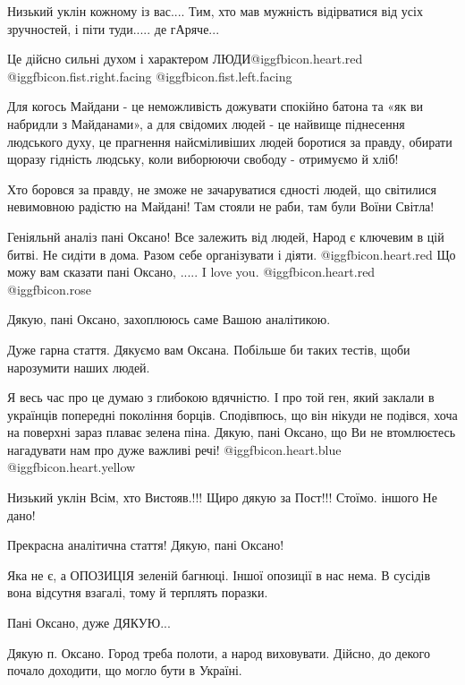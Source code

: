 \begin{itemize}
Низький уклін кожному із вас.... Тим, хто мав мужність відірватися від усіх
зручностей, і піти туди..... де гАряче...

Це дійсно сильні духом і характером ЛЮДИ@igg{fbicon.heart.red} @igg{fbicon.fist.right.facing}  @igg{fbicon.fist.left.facing} 



Для когось Майдани - це неможливість дожувати спокійно батона та «як ви
набридли з Майданами», а для свідомих людей - це найвище піднесення людського
духу, це прагнення найсміливіших людей боротися за правду, обирати щоразу
гідність людську, коли виборюючи свободу - отримуємо й хліб!

Хто боровся за правду, не зможе не зачаруватися єдності людей, що світилися
невимовною радістю на Майдані! Там стояли не раби, там були Воїни Світла!


Геніяльнй аналіз пані Оксано! Все залежить від людей, Народ є ключевим в цій
битві. Не сидіти в дома. Разом себе організувати і діяти. @igg{fbicon.heart.red} Що можу вам сказати
пані Оксано, ..... I love you. @igg{fbicon.heart.red} @igg{fbicon.rose} 


Дякую, пані Оксано, захоплююсь саме Вашою аналітикою.

Дуже гарна стаття. Дякуємо вам Оксана. Побільше би таких тестів, щоби нарозумити наших людей.


Я весь час про це думаю з глибокою вдячністю. І про той ген, який заклали в
українців попередні покоління борців. Сподівпюсь, що він нікуди не подівся,
хоча на поверхні зараз плаває зелена піна. Дякую, пані Оксано, що Ви не
втомлюєтесь нагадувати нам про дуже важливі речі! @igg{fbicon.heart.blue}  @igg{fbicon.heart.yellow} 


Низький уклін Всім, хто Вистояв.!!! Щиро дякую за Пост!!! Стоїмо. іншого Не дано!

Прекрасна аналітична стаття! Дякую, пані Оксано!

Яка не є, а ОПОЗИЦІЯ зеленій багнюці. Іншої опозиції в нас нема. В сусідів вона відсутня взагалі, тому й терплять поразки.

Пані Оксано, дуже ДЯКУЮ...

Дякую п. Оксано. Город треба полоти, а народ виховувати. Дійсно, до декого почало доходити, що могло бути в Україні.


\end{itemize}
